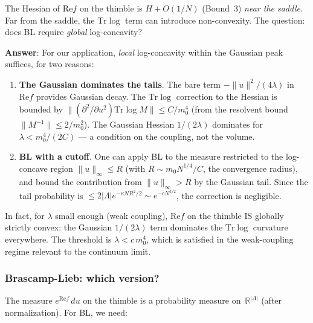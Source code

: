 \documentclass[12pt]{article}
\theoremstyle{definition}
\theoremstyle{remark}
\newcommand{\R}{\mathbb{R}}
\newcommand{\Tr}{\mathrm{Tr}}
\newcommand{\La}{\Lambda}
\newcommand{\re}{\mathrm{Re}}
\begin{document}
The Hessian of $\re f$ on the thimble is $H + O(1/N)$
(Bound~3) \emph{near the saddle}. Far from the saddle, the
$\Tr\log$ term can introduce non-convexity. The question: does
BL require \emph{global} log-concavity?

\textbf{Answer}: For our application, \emph{local} log-concavity
within the Gaussian peak suffices, for two reasons:

\begin{enumerate}
\item \textbf{The Gaussian dominates the tails}. The bare term
  $-\|u\|^2/(4\lambda)$ in $\re f$ provides Gaussian decay.
  The $\Tr\log$ correction to the Hessian is bounded by
  $\|(\partial^2/\partial u^2)\Tr\log M\| \le C/m_0^4$
  (from the resolvent bound $\|M^{-1}\| \le 2/m_0^2$).
  The Gaussian Hessian $1/(2\lambda)$ dominates for
  $\lambda < m_0^4/(2C)$ --- a condition on the coupling,
  not the volume.

\item \textbf{BL with a cutoff}. One can apply BL to the
  measure restricted to the log-concave region
  $\|u\|_\infty \le R$ (with $R \sim m_0 N^{1/4}/C$, the
  convergence radius), and bound the contribution from
  $\|u\|_\infty > R$ by the Gaussian tail. Since the tail
  probability is $\le 2|\La|e^{-\kappa NR^2/2}
  \sim e^{-cN^{3/2}}$, the correction is negligible.
\end{enumerate}

In fact, for $\lambda$ small enough (weak coupling), $\re f$ on
the thimble IS globally strictly convex: the Gaussian $1/(2\lambda)$
term dominates the $\Tr\log$ curvature everywhere. The threshold
is $\lambda < c\,m_0^4$, which is satisfied in the weak-coupling
regime relevant to the continuum limit.

\subsubsection{Brascamp-Lieb: which version?}

The measure $e^{\re f}\,du$ on the thimble is a probability
measure on~$\R^{|\La|}$ (after normalization). For BL, we need:
\end{document}
